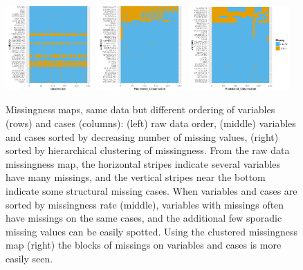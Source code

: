 \documentclass[article]{jss}
\begin{document}
\begin{center}
\begin{figure}[h]
\begin{centering}
\includegraphics[width=0.3\textwidth]{graph/fig5-3-missingmap-1}
\includegraphics[width=0.3\textwidth]{graph/fig5-3-missingmap-2}
\includegraphics[width=0.345\textwidth]{graph/fig5-3-missingmap-3}
\par\end{centering}
\caption{Missingness maps, same data but different ordering
of variables (rows) and cases (columns): (left) raw data order,
(middle) variables and cases sorted by decreasing number of
missing values, (right) sorted by hierarchical clustering of
missingness. From the raw data missingness map, the horizontal
stripes indicate several variables have many missings, and the
vertical stripes near the bottom indicate some structural
missing cases. When variables and cases are sorted by
missingness rate (middle), variables with missings often have
missings on the same cases, and the additional few sporadic
missing values can be easily spotted. Using the clustered
missingness map (right) the blocks of missings on variables
and cases is more easily seen.}
\label{fig:missingmap}
\end{figure}
\par\end{center}
\end{document}
